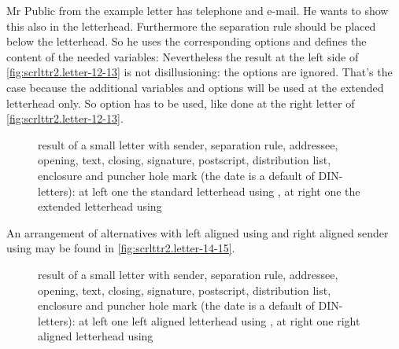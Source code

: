 \begin{Example}
  Mr Public from the example letter has telephone and e-mail. He wants to show
  this also in the letterhead. Furthermore the separation rule should be
  placed below the letterhead. So he uses the corresponding options and
  defines the content of the needed variables:%
  Nevertheless the result at the left side of
  \autoref{fig:scrlttr2.letter-12-13} is not disillusioning: the options are
  ignored. That's the case because the additional variables and options will
  be used at the extended letterhead only. So option  has to
  be used, like done at the right letter of
  \autoref{fig:scrlttr2.letter-12-13}.
  \begin{figure}
    \centering
    \quad
    \caption[{Example: letter with extended sender, separation rule, addressee,
      opening, text, closing, signature, postscript, distribution list,
      enclosure, and puncher hole mark; standard vs. extended letterhead}]
    {result of a small letter with sender, separation rule, addressee,
      opening, text, closing, signature, postscript, distribution list,
      enclosure and puncher hole mark (the date is a default of DIN-letters):
      at left one the standard letterhead using
      , at right one the extended letterhead
      using }
    \label{fig:scrlttr2.letter-12-13}
  \end{figure}

  An arrangement of alternatives with left aligned using
   and right aligned sender
  using  may be found in
  \autoref{fig:scrlttr2.letter-14-15}.
  \begin{figure}
    \centering
    \quad
    \caption[{Example: letter with extended sender, separation rule, addressee,
      opening, text, closing, signature, postscript, distribution list,
      enclosure, and puncher hole mark; left vs. right aligned letterhead}]
    {result of a small letter with sender, separation rule, addressee,
      opening, text, closing, signature, postscript, distribution list,
      enclosure and puncher hole mark (the date is a default of DIN-letters):
      at left one left aligned letterhead using
      , at right one right aligned letterhead
      using }
    \label{fig:scrlttr2.letter-14-15}
  \end{figure}
\end{Example}
